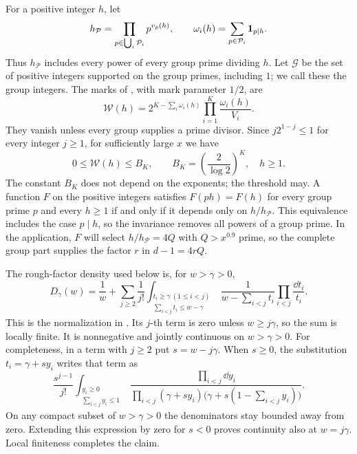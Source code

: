 For a positive integer \(h\), let
\begin{equation}\label{eq:complete-group-part}
 h_{\mathcal P}=\prod_{p\in\bigcup_i\mathcal P_i}p^{v_p(h)},
 \qquad
 \omega_i(h)=\sum_{p\in\mathcal P_i}\mathbf 1_{p\mid h}.
\end{equation}
Thus \(h_{\mathcal P}\) includes every power of every group prime dividing
\(h\).  Let \(\mathcal G\) be the set of positive integers supported on
the group primes, including \(1\); we call these the group integers.
The marks of \cite[Section~10]{PrimitiveRoot2}, with mark parameter
\(1/2\), are
\begin{equation}\label{eq:marked-weight}
 \mathcal W(h)=2^{K-\sum_i\omega_i(h)}
                    \prod_{i=1}^K\frac{\omega_i(h)}{V_i}.
\end{equation}
They vanish unless every group supplies a prime divisor.  Since
\(j2^{1-j}\le1\) for every integer \(j\ge1\), for sufficiently large
\(x\) we have
\begin{equation}\label{eq:mark-bound}
 0\le\mathcal W(h)\le B_K,\qquad B_K=\left(\frac2{\log2}\right)^K,
 \quad h\ge1.
\end{equation}
The constant \(B_K\) does not depend on the exponents; the threshold may.
A function \(F\) on the positive integers satisfies \(F(ph)=F(h)\) for
every group prime \(p\) and every \(h\ge1\) if and only if it depends only
on \(h/h_{\mathcal P}\).  This equivalence includes the case \(p\mid h\),
so the invariance removes all powers of a group prime.
In the application, \(F\) will select \(h/h_{\mathcal P}=4Q\) with
\(Q>x^{0.9}\) prime, so the complete group part supplies the factor \(r\)
in \(d-1=4rQ\).

The rough-factor density used below is, for \(w>\gamma>0\),
\begin{equation}\label{eq:rough-density}
 D_\gamma(w)=\frac1w+
 \sum_{j\ge2}\frac1{j!}
 \int_{\substack{t_i\ge\gamma\ (1\le i<j)\\
                  \sum_{i<j}t_i\le w-\gamma}}
 \frac1{w-\sum_{i<j}t_i}\prod_{i<j}\frac{\dd t_i}{t_i}.
\end{equation}
This is the normalization in \cite[Section~10]{PrimitiveRoot2}.  Its
\(j\)-th term is zero unless \(w\ge j\gamma\), so the sum is locally
finite.  It is nonnegative and jointly continuous on \(w>\gamma>0\).
For completeness, in a term with \(j\ge2\) put \(s=w-j\gamma\).  When
\(s\ge0\), the substitution \(t_i=\gamma+s y_i\) writes that term as
\[
 \frac{s^{j-1}}{j!}
 \int_{\substack{y_i\ge0\\\sum_{i<j}y_i\le1}}
 \frac{\prod_{i<j}\dd y_i}
 {\prod_{i<j}(\gamma+s y_i)
       \bigl(\gamma+s(1-\sum_{i<j}y_i)\bigr)}.
\]
On any compact subset of \(w>\gamma>0\) the denominators stay bounded
away from zero.  Extending this expression by zero for \(s<0\) proves
continuity also at \(w=j\gamma\).  Local finiteness completes the claim.


